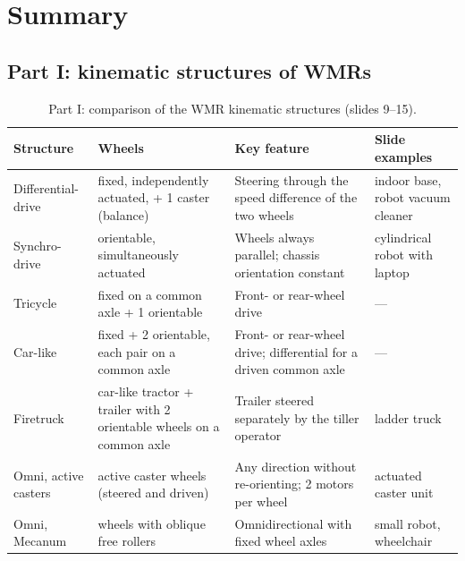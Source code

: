 \documentclass[11pt,a4paper]{article}
\theoremstyle{definition}
\theoremstyle{plain}
\begin{document}
\section{Summary}
 
\subsection{Part I: kinematic structures of WMRs}
 
\begin{table}[H]
\centering\footnotesize
\renewcommand{\arraystretch}{1.25}
\begin{tabular}{@{}>{\raggedright\arraybackslash}p{2.4cm}>{\raggedright\arraybackslash}p{3.9cm}>{\raggedright\arraybackslash}p{4.9cm}>{\raggedright\arraybackslash}p{2.5cm}@{}}
\toprule
Structure & Wheels & Key feature & Slide examples\\
\midrule
Differential-drive & 2 fixed, independently actuated, + 1 caster (balance) & Steering through the speed difference of the two wheels & indoor base, robot vacuum cleaner\\
Synchro-drive & 3 orientable, simultaneously actuated & Wheels always parallel; chassis orientation constant & cylindrical robot with laptop\\
Tricycle & 2 fixed on a common axle + 1 orientable & Front- or rear-wheel drive & ---\\
Car-like & 2 fixed + 2 orientable, each pair on a common axle & Front- or rear-wheel drive; differential for a driven common axle & ---\\
Firetruck & car-like tractor + trailer with 2 orientable wheels on a common axle & Trailer steered separately by the tiller operator & ladder truck\\
Omni, active casters & active caster wheels (steered and driven) & Any direction without re-orienting; 2 motors per wheel & actuated caster unit\\
Omni, Mecanum & wheels with oblique free rollers & Omnidirectional with fixed wheel axles & small robot, wheelchair\\
\bottomrule
\end{tabular}
\caption{Part I: comparison of the WMR kinematic structures (slides 9--15).}
\end{table}
 
\end{document}
